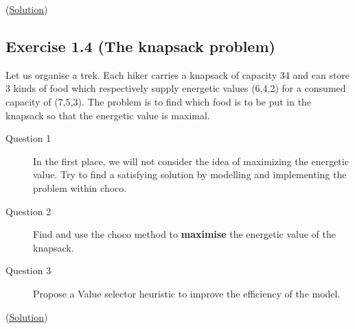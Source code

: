 
(\hyperlink{solutions:solutionofexercise1.3}{Solution})

\subsection{Exercise 1.4 (The knapsack problem)}\label{exercises:exercise1.4}\hypertarget{exercises:exercise1.4}{}
Let us organise a trek. Each hiker carries a knapsack of capacity 34 and can store 3 kinds of food which respectively supply energetic values (6,4,2) for a consumed capacity of (7,5,3). The problem is to find which food is to be put in the knapsack so that the energetic value is maximal.

\begin{description}
	\item[Question 1] In the first place, we will not consider the idea of maximizing the energetic value. Try to find a satisfying solution by modelling and implementing the problem within choco.
	\item[Question 2] Find and use the choco method to \textbf{maximise} the energetic value of the knapsack.
	\item[Question 3] Propose a Value selector heuristic to improve the efficiency of the model.
\end{description}

(\hyperlink{solutions:solutionofexercise1.4}{Solution})

